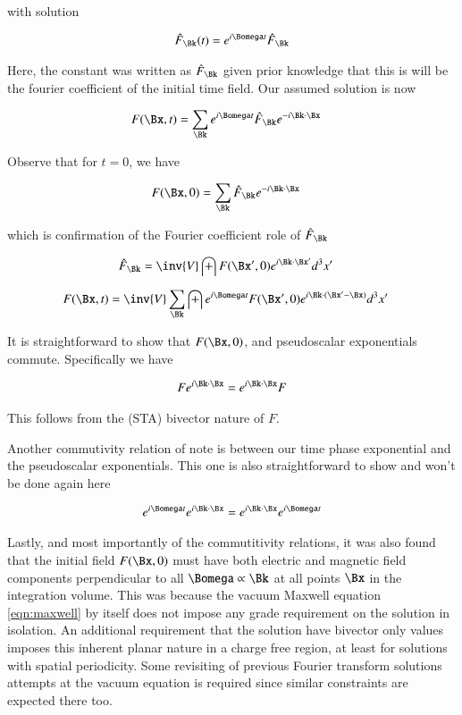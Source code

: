 \documentclass{article}
\begin{document}
with solution

\begin{align}
\hat{F}_{\Bk}(t) = e^{i \Bomega t} \hat{F}_{\Bk}
\end{align}

Here, the constant was written as $\hat{F}_{\Bk}$ given prior knowledge that this is will be the fourier coefficient of the
initial time field.  Our assumed solution is now

\begin{align}
F(\Bx,t) &= \sum_{\Bk} e^{i \Bomega t} \hat{F}_{\Bk} e^{-i \Bk \cdot \Bx} 
\end{align}

Observe that for $t = 0$, we have

\begin{align*}
F(\Bx,0) &= \sum_{\Bk} \hat{F}_{\Bk} e^{-i \Bk \cdot \Bx} 
\end{align*}

which is confirmation of the Fourier coefficient role of $\hat{F}_{\Bk}$

\begin{align}
\hat{F}_{\Bk} &= \inv{V} \int F(\Bx', 0) e^{ i \Bk \cdot \Bx' } d^3 x'
\end{align}

\begin{align}
F(\Bx,t) &= \inv{V} \sum_{\Bk} \int e^{i \Bomega t} F(\Bx', 0) e^{i \Bk \cdot (\Bx'-\Bx) } d^3 x'
\end{align}

It is straightforward to show that $F(\Bx, 0)$, and pseudoscalar exponentials commute.  Specifically we have

\begin{align}
F e^{ i \Bk \cdot \Bx } = e^{ i \Bk \cdot \Bx } F
\end{align}

This follows from the (STA) bivector nature of $F$.

Another commutivity relation of note is between our time phase exponential and the pseudoscalar exponentials.  This one is also straightforward to show
and won't be done again here

\begin{align}
e^{ i \Bomega t} e^{ i \Bk \cdot \Bx } = e^{ i \Bk \cdot \Bx } e^{ i \Bomega t} 
\end{align}

Lastly, and most importantly of the commutitivity relations,
it was also found that the initial field $F(\Bx,0)$ must have both electric and magnetic field components perpendicular to all $\Bomega \propto \Bk$ at all points
$\Bx$ in the integration volume.  
This was because the vacuum Maxwell equation \ref{eqn:maxwell} by itself does not impose any grade requirement on the solution in isolation.  An
additional requirement that the solution have bivector only values imposes this inherent planar nature in a charge free region, at least for solutions
with spatial periodicity.  Some revisiting of previous Fourier transform solutions attempts at the vacuum equation is required since similar constraints are
expected there too.
\end{document}
